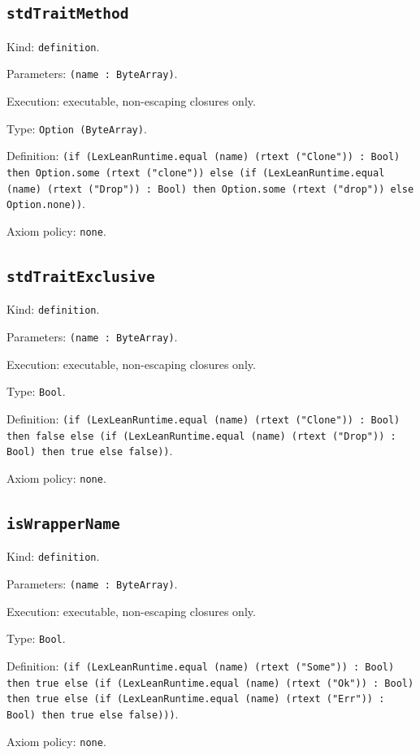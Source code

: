 \documentclass[11pt]{article}
\begin{document}
\subsection*{\texttt{stdTraitMethod}}
\noindent Kind: \texttt{definition}.\par
\noindent Parameters: \texttt{(name : ByteArray)}.\par
\noindent Execution: executable, non-escaping closures only.\par
\noindent Type: \texttt{Option (ByteArray)}.\par
\noindent Definition: \texttt{(if (LexLeanRuntime.equal (name) (rtext ("Clone")) : Bool) then Option.some (rtext ("clone")) else (if (LexLeanRuntime.equal (name) (rtext ("Drop")) : Bool) then Option.some (rtext ("drop")) else Option.none))}.\par
\noindent Axiom policy: \texttt{none}.\par
\subsection*{\texttt{stdTraitExclusive}}
\noindent Kind: \texttt{definition}.\par
\noindent Parameters: \texttt{(name : ByteArray)}.\par
\noindent Execution: executable, non-escaping closures only.\par
\noindent Type: \texttt{Bool}.\par
\noindent Definition: \texttt{(if (LexLeanRuntime.equal (name) (rtext ("Clone")) : Bool) then false else (if (LexLeanRuntime.equal (name) (rtext ("Drop")) : Bool) then true else false))}.\par
\noindent Axiom policy: \texttt{none}.\par
\subsection*{\texttt{isWrapperName}}
\noindent Kind: \texttt{definition}.\par
\noindent Parameters: \texttt{(name : ByteArray)}.\par
\noindent Execution: executable, non-escaping closures only.\par
\noindent Type: \texttt{Bool}.\par
\noindent Definition: \texttt{(if (LexLeanRuntime.equal (name) (rtext ("Some")) : Bool) then true else (if (LexLeanRuntime.equal (name) (rtext ("Ok")) : Bool) then true else (if (LexLeanRuntime.equal (name) (rtext ("Err")) : Bool) then true else false)))}.\par
\noindent Axiom policy: \texttt{none}.\par
\end{document}
